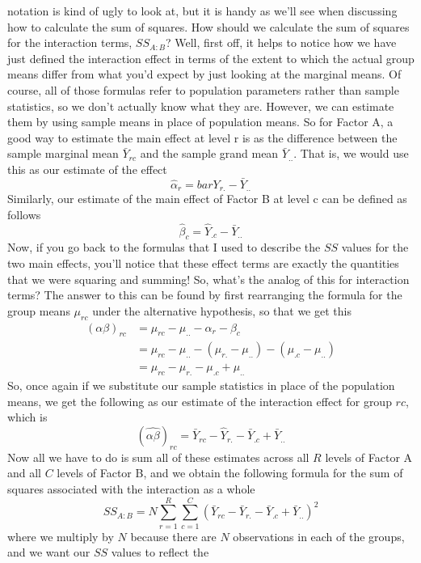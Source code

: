 \documentclass[
  a4paper,
]{book}
\begin{document}
{  notation is kind of ugly to look at, but it is handy as we'll see when
  discussing how to calculate the sum of squares. How should we
  calculate the sum of squares for the interaction terms, \(SS_{A:B}\)?
  Well, first off, it helps to notice how we have just defined the
  interaction effect in terms of the extent to which the actual group
  means differ from what you'd expect by just looking at the marginal
  means. Of course, all of those formulas refer to population parameters
  rather than sample statistics, so we don't actually know what they
  are. However, we can estimate them by using sample means in place of
  population means. So for Factor A, a good way to estimate the main
  effect at level r is as the difference between the sample marginal
  mean \(\bar{Y}_{rc}\) and the sample grand mean \(\bar{Y}_{..}\). That
  is, we would use this as our estimate of the effect
  \[\hat{\alpha}_r = bar{Y}_{r.}-\bar{Y}_{..}\] Similarly, our estimate
  of the main effect of Factor B at level c can be defined as follows
  \[\hat{\beta}_{c}=\hat{Y}_{.c}-\bar{Y}_{..}\] Now, if you go back to
  the formulas that I used to describe the \(SS\) values for the two
  main effects, you'll notice that these effect terms are exactly the
  quantities that we were squaring and summing! So, what's the analog of
  this for interaction terms? The answer to this can be found by first
  rearranging the formula for the group means \(\mu_{rc}\) under the
  alternative hypothesis, so that we get this
  \[\begin{aligned} (\alpha \beta)_{rc} & = \mu_{rc} - \mu_{..} - \alpha_r - \beta_c \\ & = \mu_{rc} - \mu_{..} - (\mu_{r.}-\mu_{..})-(\mu_{.c}-\mu_{..}) \\ & = \mu_{rc} - \mu_{r.} - \mu_{.c} +\mu_{..} \end{aligned}\]
  So, once again if we substitute our sample statistics in place of the
  population means, we get the following as our estimate of the
  interaction effect for group \(rc\), which is
  \[(\hat{\alpha \beta})_{rc}=\bar{Y}_{rc}-\hat{Y}_{r.}-\bar{Y}_{.c}+\bar{Y}_{..}\]
  Now all we have to do is sum all of these estimates across all \(R\)
  levels of Factor A and all \(C\) levels of Factor B, and we obtain the
  following formula for the sum of squares associated with the
  interaction as a whole
  \[SS_{A:B}=N \sum_{r=1}^R \sum_{c=1}^C (\bar{Y}_{rc}-\bar{Y}_{r.}-\bar{Y}_{.c}+\bar{Y}_{..})^2\]
  where we multiply by \(N\) because there are \(N\) observations in
  each of the groups, and we want our \(SS\) values to reflect the
}
\end{document}
